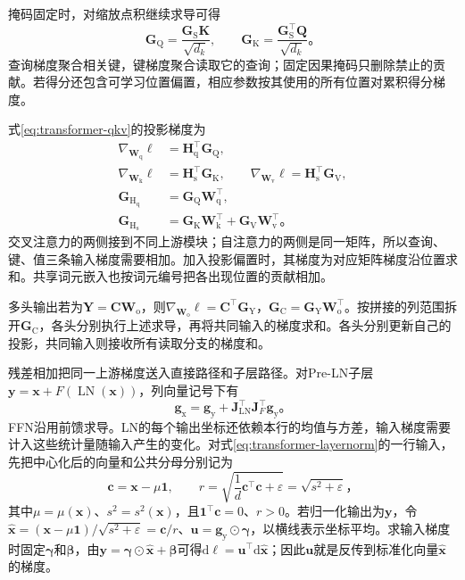 掩码固定时，对缩放点积继续求导可得
\begin{equation}
  \bm G_{\mathrm Q}=\frac{\bm G_{\mathrm S}\bm K}{\sqrt{d_k}},\qquad
  \bm G_{\mathrm K}=\frac{\bm G_{\mathrm S}^{\top}\bm Q}{\sqrt{d_k}}\text{。}
  \label{eq:transformer-qk-gradient}
\end{equation}
查询梯度聚合相关键，键梯度聚合读取它的查询；固定因果掩码只删除禁止的贡献。若得分还包含可学习位置偏置，相应参数按其使用的所有位置对累积得分梯度。

式\eqref{eq:transformer-qkv}的投影梯度为
\begin{equation}
  \begin{aligned}
    \nabla_{\bm W_{\mathrm q}}\ell&=\bm H_{\mathrm q}^{\top}\bm G_{\mathrm Q},\\
    \nabla_{\bm W_{\mathrm k}}\ell&=\bm H_{\mathrm s}^{\top}\bm G_{\mathrm K},\qquad
    \nabla_{\bm W_{\mathrm v}}\ell=\bm H_{\mathrm s}^{\top}\bm G_{\mathrm V},\\
    \bm G_{\mathrm H_{\mathrm q}}&=\bm G_{\mathrm Q}\bm W_{\mathrm q}^{\top},\\
    \bm G_{\mathrm H_{\mathrm s}}&=\bm G_{\mathrm K}\bm W_{\mathrm k}^{\top}
                      +\bm G_{\mathrm V}\bm W_{\mathrm v}^{\top}\text{。}
  \end{aligned}
  \label{eq:transformer-projection-gradient}
\end{equation}
交叉注意力的两侧接到不同上游模块；自注意力的两侧是同一矩阵，所以查询、键、值三条输入梯度需要相加。加入投影偏置时，其梯度为对应矩阵梯度沿位置求和。共享词元嵌入也按词元编号把各出现位置的贡献相加。

多头输出若为$\bm Y=\bm C\bm W_{\mathrm o}$，则$\nabla_{\bm W_{\mathrm o}}\ell=\bm C^{\top}\bm G_{\mathrm Y}$，$\bm G_{\mathrm C}=\bm G_{\mathrm Y}\bm W_{\mathrm o}^{\top}$。按拼接的列范围拆开$\bm G_{\mathrm C}$，各头分别执行上述求导，再将共同输入的梯度求和。各头分别更新自己的投影，共同输入则接收所有读取分支的梯度和。

残差相加把同一上游梯度送入直接路径和子层路径。对Pre-LN子层$\bm y=\bm x+F(\operatorname{LN}(\bm x))$，列向量记号下有
\begin{equation}
  \bm g_{\mathrm x}=\bm g_{\mathrm y}
     +\bm J_{\operatorname{LN}}^{\top}\bm J_F^{\top}\bm g_{\mathrm y}\text{。}
  \label{eq:transformer-preln-gradient}
\end{equation}
FFN沿用前馈求导。LN的每个输出坐标还依赖本行的均值与方差，输入梯度需要计入这些统计量随输入产生的变化。对式\eqref{eq:transformer-layernorm}的一行输入，先把中心化后的向量和公共分母分别记为
\[
  \bm c=\bm x-\mu\bm1,\qquad
  r=\sqrt{\frac1d\bm c^{\top}\bm c+\varepsilon}
   =\sqrt{s^2+\varepsilon}\text{，}
\]
其中$\mu=\mu(\bm x)$、$s^2=s^2(\bm x)$，且$\bm1^{\top}\bm c=0$、$r>0$。若归一化输出为$\bm y$，令$\widehat{\bm x}=(\bm x-\mu\bm1)/\sqrt{s^2+\varepsilon}=\bm c/r$、$\bm u=\bm g_{\mathrm y}\odot\bm\gamma$，以横线表示坐标平均。求输入梯度时固定$\bm\gamma$和$\bm\beta$，由$\bm y=\bm\gamma\odot\widehat{\bm x}+\bm\beta$可得$\mathrm d\ell=\bm u^{\top}\mathrm d\widehat{\bm x}$；因此$\bm u$就是反传到标准化向量$\widehat{\bm x}$的梯度。

